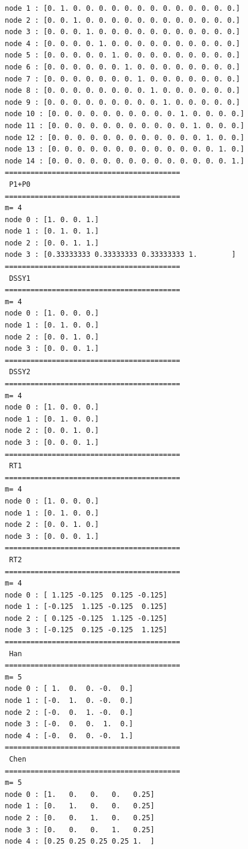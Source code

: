 \begin{scriptsize}
\begin{verbatim}
node 1 : [0. 1. 0. 0. 0. 0. 0. 0. 0. 0. 0. 0. 0. 0. 0.]
node 2 : [0. 0. 1. 0. 0. 0. 0. 0. 0. 0. 0. 0. 0. 0. 0.]
node 3 : [0. 0. 0. 1. 0. 0. 0. 0. 0. 0. 0. 0. 0. 0. 0.]
node 4 : [0. 0. 0. 0. 1. 0. 0. 0. 0. 0. 0. 0. 0. 0. 0.]
node 5 : [0. 0. 0. 0. 0. 1. 0. 0. 0. 0. 0. 0. 0. 0. 0.]
node 6 : [0. 0. 0. 0. 0. 0. 1. 0. 0. 0. 0. 0. 0. 0. 0.]
node 7 : [0. 0. 0. 0. 0. 0. 0. 1. 0. 0. 0. 0. 0. 0. 0.]
node 8 : [0. 0. 0. 0. 0. 0. 0. 0. 1. 0. 0. 0. 0. 0. 0.]
node 9 : [0. 0. 0. 0. 0. 0. 0. 0. 0. 1. 0. 0. 0. 0. 0.]
node 10 : [0. 0. 0. 0. 0. 0. 0. 0. 0. 0. 1. 0. 0. 0. 0.]
node 11 : [0. 0. 0. 0. 0. 0. 0. 0. 0. 0. 0. 1. 0. 0. 0.]
node 12 : [0. 0. 0. 0. 0. 0. 0. 0. 0. 0. 0. 0. 1. 0. 0.]
node 13 : [0. 0. 0. 0. 0. 0. 0. 0. 0. 0. 0. 0. 0. 1. 0.]
node 14 : [0. 0. 0. 0. 0. 0. 0. 0. 0. 0. 0. 0. 0. 0. 1.]
=========================================
 P1+P0
=========================================
m= 4
node 0 : [1. 0. 0. 1.]
node 1 : [0. 1. 0. 1.]
node 2 : [0. 0. 1. 1.]
node 3 : [0.33333333 0.33333333 0.33333333 1.        ]
=========================================
 DSSY1
=========================================
m= 4
node 0 : [1. 0. 0. 0.]
node 1 : [0. 1. 0. 0.]
node 2 : [0. 0. 1. 0.]
node 3 : [0. 0. 0. 1.]
=========================================
 DSSY2
=========================================
m= 4
node 0 : [1. 0. 0. 0.]
node 1 : [0. 1. 0. 0.]
node 2 : [0. 0. 1. 0.]
node 3 : [0. 0. 0. 1.]
=========================================
 RT1
=========================================
m= 4
node 0 : [1. 0. 0. 0.]
node 1 : [0. 1. 0. 0.]
node 2 : [0. 0. 1. 0.]
node 3 : [0. 0. 0. 1.]
=========================================
 RT2
=========================================
m= 4
node 0 : [ 1.125 -0.125  0.125 -0.125]
node 1 : [-0.125  1.125 -0.125  0.125]
node 2 : [ 0.125 -0.125  1.125 -0.125]
node 3 : [-0.125  0.125 -0.125  1.125]
=========================================
 Han
=========================================
m= 5
node 0 : [ 1.  0.  0. -0.  0.]
node 1 : [-0.  1.  0. -0.  0.]
node 2 : [-0.  0.  1. -0.  0.]
node 3 : [-0.  0.  0.  1.  0.]
node 4 : [-0.  0.  0. -0.  1.]
=========================================
 Chen
=========================================
m= 5
node 0 : [1.   0.   0.   0.   0.25]
node 1 : [0.   1.   0.   0.   0.25]
node 2 : [0.   0.   1.   0.   0.25]
node 3 : [0.   0.   0.   1.   0.25]
node 4 : [0.25 0.25 0.25 0.25 1.  ]

\end{verbatim}
\end{scriptsize}


\newpage
